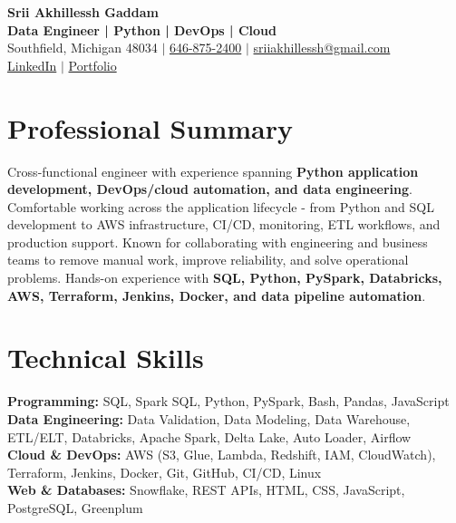 \documentclass[letterpaper,10pt]{article}
\begin{document}
\fontsize{9.35pt}{10.45pt}\selectfont

\begin{center}
    {\LARGE \textbf{Srii Akhillessh Gaddam}} \\[-1pt]
    \textbf{Data Engineer | Python | DevOps | Cloud} \\[2pt]
    Southfield, Michigan 48034 $|$
    \href{tel:6468752400}{646-875-2400} $|$
    \href{mailto:sriiakhillessh@gmail.com}{sriiakhillessh@gmail.com} \\[1pt]
    \href{https://www.linkedin.com/in/srii-akhiilessh-gaddam-b48668191/}{LinkedIn} $|$
    \href{https://sriiakhillesshg.github.io/portfolio/}{Portfolio}
\end{center}
\vspace{-8pt}

\section{Professional Summary}
\small{Cross-functional engineer with experience spanning \textbf{Python application development, DevOps/cloud automation, and data engineering}. Comfortable working across the application lifecycle - from Python and SQL development to AWS infrastructure, CI/CD, monitoring, ETL workflows, and production support. Known for collaborating with engineering and business teams to remove manual work, improve reliability, and solve operational problems. Hands-on experience with \textbf{SQL, Python, PySpark, Databricks, AWS, Terraform, Jenkins, Docker, and data pipeline automation}.}

\section{Technical Skills}
\small{
\textbf{Programming:} SQL, Spark SQL, Python, PySpark, Bash, Pandas, JavaScript \\
\textbf{Data Engineering:} Data Validation, Data Modeling, Data Warehouse, ETL/ELT, Databricks, Apache Spark, Delta Lake, Auto Loader, Airflow \\
\textbf{Cloud \& DevOps:} AWS (S3, Glue, Lambda, Redshift, IAM, CloudWatch), Terraform, Jenkins, Docker, Git, GitHub, CI/CD, Linux \\
\textbf{Web \& Databases:} Snowflake, REST APIs, HTML, CSS, JavaScript, PostgreSQL, Greenplum
}
\end{document}
